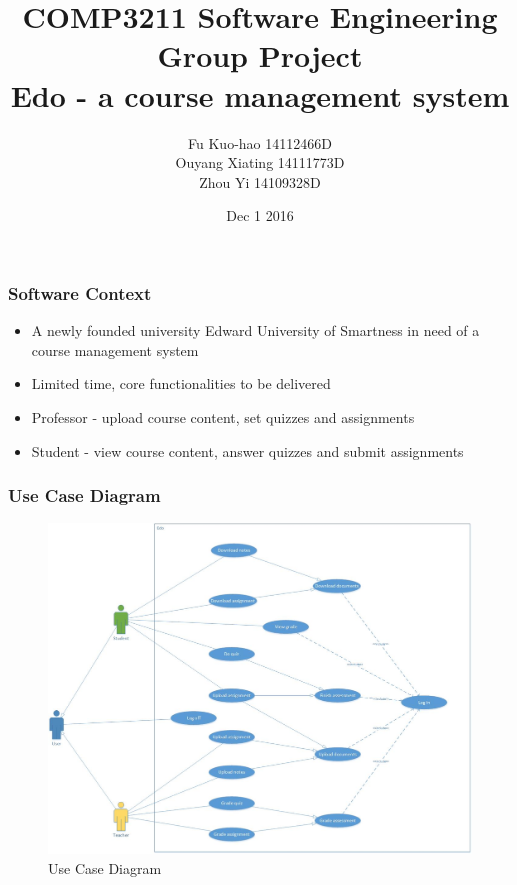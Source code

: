 \documentclass{beamer}
\title[SE Project]{COMP3211 Software Engineering \\
                        Group Project \\
                        Edo - a course management system} %
\author{Fu Kuo-hao 14112466D \\
        Ouyang Xiating 14111773D \\
        Zhou Yi 14109328D} %
\institute %
{
Department of Computing
}
\date{Dec 1 2016} %
\begin{document}
\begin{frame}
\titlepage %
\end{frame}

\begin{frame}
\frametitle{Software Context} %
\begin{itemize}
	\item A newly founded university Edward University of Smartness in need of a course management system
	\item Limited time, core functionalities to be delivered
	\item Professor - upload course content, set quizzes and assignments
	\item Student - view course content, answer quizzes and submit assignments
\end{itemize}
\end{frame}


\begin{frame}
\frametitle{Use Case Diagram}
\begin{figure}[!ht]
	\begin{center}
		\includegraphics[width=\textwidth,height=0.7\textheight,keepaspectratio]{usecase}
	\end{center}
	\caption{Use Case Diagram}
\end{figure}
\end{frame}
\end{document}
